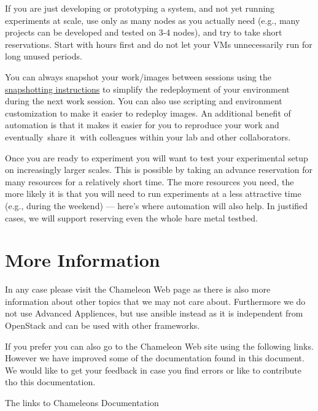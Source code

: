 \begin{description}
\item
  \item[Think Small for Development and class use:] If you are just developing or
  prototyping a system, and not yet running experiments at scale, use
  only as many nodes as you actually need (e.g., many projects can be
  developed and tested on 3-4 nodes), and try to take short
  reservations. Start with hours first and do not let your VMs
  unnecessarily run for long unused periods. 
\item
  \item[Automate deployments:] You can always snapshot your work/images
  between sessions using the
  \href{https://www.chameleoncloud.org/docs/user-guides/ironic/\#snapshotting_an_instance}{snapshotting
  instructions} to simplify the redeployment of your environment during
  the next work session. You can also use scripting and environment
  customization to make it easier to redeploy images. An additional
  benefit of automation is that it makes it easier for you to reproduce
  your work and eventually~share it~with colleagues within your lab and
  other collaborators.
\item [Think Big for Experimentation:] Once you are ready to experiment you
  will want to test your experimental setup on increasingly larger
  scales. This is possible by taking an advance reservation for many
  resources for a relatively short time. The more resources you need,
  the more likely it is that you will need to run experiments at a less
  attractive time (e.g., during the weekend) --- here's where automation
  will also help. In justified cases, we will support reserving even the
  whole bare metal testbed.
\end{description}

\section{More Information}

In any case please visit the Chameleon Web page as there is also more
information about other topics that we may not care about. Furthermore
we do not use Advanced Appliences, but use ansible instead as it is
independent from OpenStack and can be used with other frameworks.

If you prefer you can also go to the Chameleon Web site using the
following links. However we have improved some of the documentation
found in this document. We would like to get your feedback in case you
find errors or like to contribute tho this documentation.

The links to Chameleons Documentation 












%